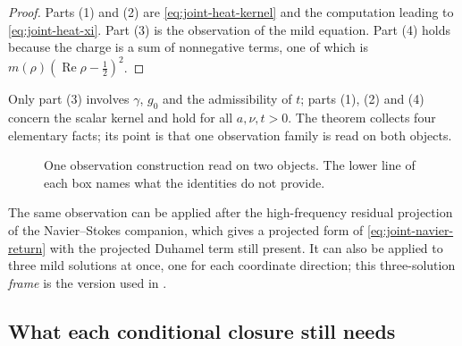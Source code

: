 \begin{proof}
Parts (1) and (2) are \eqref{eq:joint-heat-kernel} and the computation
leading to \eqref{eq:joint-heat-xi}.  Part (3) is the observation of the
mild equation.  Part (4) holds because the charge is a sum of
nonnegative terms, one of which is \(m(\rho)(\operatorname{Re}\rho-\frac12)^{2}\).
\end{proof}

Only part (3) involves \(\gamma\), \(g_{0}\) and the admissibility of
\(t\); parts (1), (2) and (4) concern the scalar kernel and hold for
all \(a,\nu,t>0\).  The theorem collects four elementary facts; its
point is that one observation family is read on both objects.

\begin{figure}[tbp]
\centering
{}
\caption{One observation construction read on two objects.  The lower
line of each box names what the identities do not provide.}
\label{fig:joint-observation-branches}
\end{figure}

The same observation can be applied after the high-frequency residual
projection of the Navier--Stokes companion, which gives a projected
form of \eqref{eq:joint-navier-return} with the projected Duhamel term
still present.  It can also be applied to three mild solutions at once,
one for each coordinate direction; this three-solution \emph{frame} is
the version used in .

\subsection{What each conditional closure still needs}

